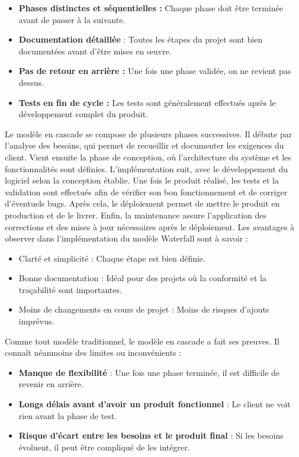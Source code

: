 \vspace{0.3cm}

\begin{itemize}
    \item \textbf{Phases distinctes et séquentielles :} Chaque phase doit être terminée avant de passer à la suivante.
    \item \textbf{Documentation détaillée }: Toutes les étapes du projet sont bien documentées avant d’être mises en œuvre.
    \item \textbf{Pas de retour en arrière :} Une fois une phase validée, on ne revient pas dessus.
    \item \textbf{Tests en fin de cycle :} Les tests sont généralement effectués après le développement complet du produit.
\end{itemize}

\vspace{0.3cm}

Le modèle en cascade se compose de plusieurs phases successives. Il débute par l'analyse des besoins, qui permet de recueillir et documenter les exigences du client. Vient ensuite la phase de conception, où l'architecture du système et les fonctionnalités sont définies. L’implémentation suit, avec le développement du logiciel selon la conception établie. Une fois le produit réalisé, les tests et la validation sont effectués afin de vérifier son bon fonctionnement et de corriger d’éventuels bugs. Après cela, le déploiement permet de mettre le produit en production et de le livrer. Enfin, la maintenance assure l’application des corrections et des mises à jour nécessaires après le déploiement. Les avantages à observer dans l'implémentation du modèle Waterfall sont à savoir : 

\vspace{0.3cm}

\begin{itemize}
    \item Clarté et simplicité : Chaque étape est bien définie.
    \item Bonne documentation : Idéal pour des projets où la conformité et la traçabilité sont importantes.
    \item Moins de changements en cours de projet : Moins de risques d’ajouts imprévus.
\end{itemize}

Comme tout modèle traditionnel, le modèle en cascade a fait ses preuves.  Il connaît néanmoins des limites ou inconvénients :

\begin{itemize}
    \item \textbf{Manque de flexibilité} : Une fois une phase terminée, il est difficile de revenir en arrière.
    \item \textbf{Longs délais avant d’avoir un produit fonctionnel} : Le client ne voit rien avant la phase de test.
    \item \textbf{Risque d’écart entre les besoins et le produit final} : Si les besoins évoluent, il peut être compliqué de les intégrer.
\end{itemize}

